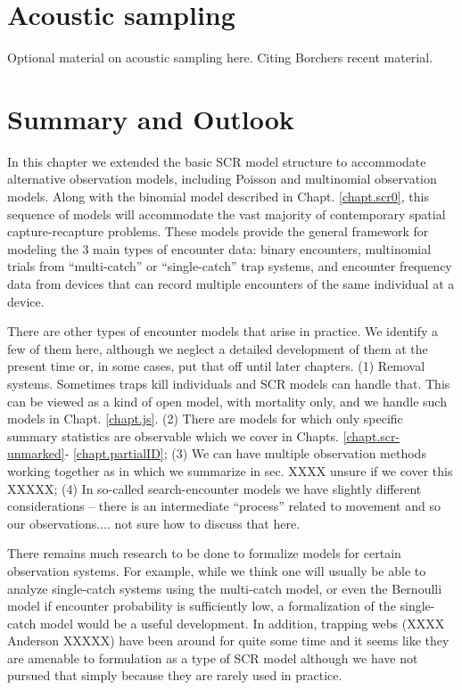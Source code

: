 \section{Acoustic sampling}

Optional material on acoustic sampling here. Citing Borchers
recent material.


\section{Summary and Outlook}

In this chapter we extended the basic SCR model structure to
accommodate alternative observation models, including Poisson and
multinomial observation models.  Along with the binomial model
described in Chapt. \ref{chapt.scr0}, this sequence of models will
accommodate the vast majority of contemporary spatial
capture-recapture problems. These models provide the general framework
for modeling the 3 main types of encounter data: binary encounters,
multinomial trials from ``multi-catch'' or ``single-catch''
\citep{efford:2004, efford:2011} trap systems, and encounter frequency
data from devices that can record multiple encounters of the same
individual at a device.

There are other types of encounter models that arise in practice. We
identify a few of them here, although we neglect a detailed
development of them at the present time or, in some cases, put that
off until later chapters.  (1) Removal systems. Sometimes traps kill
individuals and SCR models can handle that. This can be viewed as a
kind of open model, with mortality only, and we handle such models in
Chapt. \ref{chapt.js}.
(2) There are models for which only
specific summary statistics are observable \citep{chandler_royle:2012}
which we cover in Chapts. \ref{chapt.scr-unmarked}-
\ref{chapt.partialID}; (3) We can have multiple observation methods
working together as in \citet{gopalaswamy_etal:2012} which we
summarize in sec. XXXX unsure if we cover this XXXXX; 
(4) In so-called search-encounter models we
have slightly different considerations -- there is an intermediate
``process'' related to movement and so our observations.... not sure
how to discuss that here.

There remains much research to be done to formalize models for certain
observation systems. For example, while we think one will usually be
able to analyze single-catch systems using the multi-catch model, or
even the Bernoulli model if encounter probability is sufficiently low, 
a formalization of the single-catch model would be a useful
development.   In addition, trapping webs (XXXX Anderson XXXXX) have
been around for quite some time and it seems like they are amenable to
formulation as a type of SCR model although we have not pursued that 
simply because they are rarely used in practice. 

